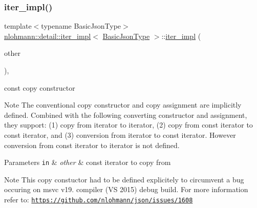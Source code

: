 \subsubsection{\texorpdfstring{iter\+\_\+impl()}{iter\_impl()}\hspace{0.1cm}{\footnotesize\ttfamily [3/4]}}
{\footnotesize\ttfamily template$<$typename Basic\+Json\+Type$>$ \\
\hyperlink{classnlohmann_1_1detail_1_1iter__impl}{nlohmann\+::detail\+::iter\+\_\+impl}$<$ \hyperlink{classnlohmann_1_1detail_1_1iter__impl_abf18f18793f84b0222aebb5a2a87da7a}{Basic\+Json\+Type} $>$\+::\hyperlink{classnlohmann_1_1detail_1_1iter__impl}{iter\+\_\+impl} (\begin{DoxyParamCaption}\item[{const \hyperlink{classnlohmann_1_1detail_1_1iter__impl}{iter\+\_\+impl}$<$ const \hyperlink{classnlohmann_1_1detail_1_1iter__impl_abf18f18793f84b0222aebb5a2a87da7a}{Basic\+Json\+Type} $>$ \&}]{other }\end{DoxyParamCaption})\hspace{0.3cm}{\ttfamily [inline]}, {\ttfamily [noexcept]}}



const copy constructor 

\begin{DoxyNote}{Note}
The conventional copy constructor and copy assignment are implicitly defined. Combined with the following converting constructor and assignment, they support\+: (1) copy from iterator to iterator, (2) copy from const iterator to const iterator, and (3) conversion from iterator to const iterator. However conversion from const iterator to iterator is not defined.
\end{DoxyNote}

\begin{DoxyParams}[1]{Parameters}
\mbox{\tt in}  & {\em other} & const iterator to copy from \\
\hline
\end{DoxyParams}
\begin{DoxyNote}{Note}
This copy constuctor had to be defined explicitely to circumvent a bug occuring on msvc v19. compiler (VS 2015) debug build. For more information refer to\+: \href{https://github.com/nlohmann/json/issues/1608}{\tt https\+://github.\+com/nlohmann/json/issues/1608} 
\end{DoxyNote}
\mbox{\label{classnlohmann_1_1detail_1_1iter__impl_a867f7eb55091be31b013adb3e46816d3}} 
